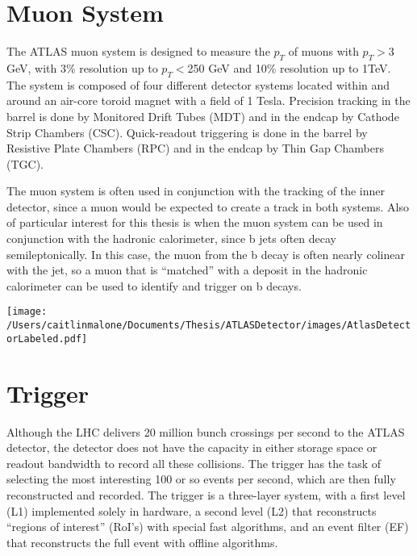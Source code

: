 
\section{Muon System}
The ATLAS muon system is designed to measure the $p_T$ of muons with $p_T>$3 GeV, with 3\% resolution up to $p_T<$250 GeV and 10\% resolution up to 1TeV.  The system is composed of four different detector systems located within and around an air-core toroid magnet with a field of 1 Tesla.  Precision tracking in the barrel is done by Monitored Drift Tubes (MDT) and in the endcap by Cathode Strip Chambers (CSC).  Quick-readout triggering is done in the barrel by Resistive Plate Chambers (RPC) and in the endcap by Thin Gap Chambers (TGC).  

The muon system is often used in conjunction with the tracking of the inner detector, since a muon would be expected to create a track in both systems.  Also of particular interest for this thesis is when the muon system can be used in conjunction with the hadronic calorimeter, since b jets often decay semileptonically.  In this case, the muon from the b decay is often nearly colinear with the jet, so a muon that is ``matched'' with a deposit in the hadronic calorimeter can be used to identify and trigger on b decays.  

\texttt{[image: /Users/caitlinmalone/Documents/Thesis/ATLASDetector/images/AtlasDetectorLabeled.pdf]}\label{fig:detector}

\section{Trigger}
Although the LHC delivers 20 million bunch crossings per second to the ATLAS detector, the detector does not have the capacity in either storage space or readout bandwidth to record all these collisions.  The trigger has the task of selecting the most interesting 100 or so events per second, which are then fully reconstructed and recorded.  The trigger is a three-layer system, with a first level (L1) implemented solely in hardware, a second level (L2) that reconstructs ``regions of interest'' (RoI's) with special fast algorithms, and an event filter (EF) that reconstructs the full event with offline algorithms.  
 

